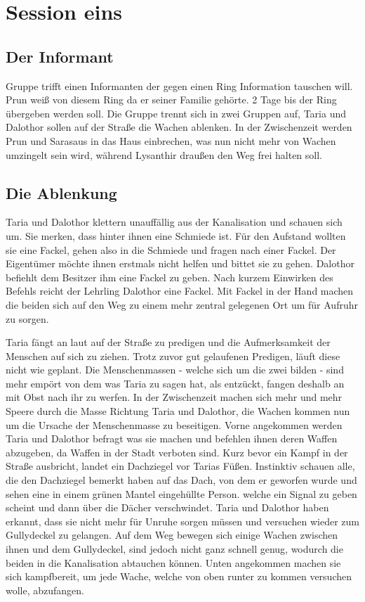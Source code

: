 \documentclass[10pt,twoside,twocolumn,openany]{book}
\begin{document}
	\chapter{Session eins}
	
	\section{Der Informant}
	
	Gruppe trifft einen Informanten der gegen einen Ring Information tauschen will.
	Prun weiß von diesem Ring da er seiner Familie gehörte.
	2 Tage bis der Ring übergeben werden soll.
	Die Gruppe trennt sich in zwei Gruppen auf, Taria und Dalothor sollen auf der Straße die Wachen ablenken. In der Zwischenzeit werden Prun und Sarasaus in das Haus einbrechen, was nun nicht mehr von Wachen umzingelt sein wird, während Lysanthir draußen den Weg frei halten soll.
	
	\section{Die Ablenkung}
	
	Taria und Dalothor klettern unauffällig aus der Kanalisation und schauen sich um. Sie merken, dass hinter ihnen eine Schmiede ist. Für den Aufstand wollten sie eine Fackel, gehen also in die Schmiede und fragen nach einer Fackel. Der Eigentümer möchte ihnen erstmals nicht helfen und bittet sie zu gehen. Dalothor befiehlt dem Besitzer ihm eine Fackel zu geben. Nach kurzem Einwirken des Befehls reicht der Lehrling Dalothor eine Fackel. Mit Fackel in der Hand machen die beiden sich auf den Weg zu einem mehr zentral gelegenen Ort um für Aufruhr zu sorgen. 

	Taria fängt an laut auf der Straße zu predigen und die Aufmerksamkeit der Menschen auf sich zu ziehen. Trotz zuvor gut gelaufenen Predigen, läuft diese nicht wie geplant. Die Menschenmassen - welche sich um die zwei bilden - sind mehr empört von dem was Taria zu sagen hat, als entzückt, fangen deshalb an mit Obst nach ihr zu werfen. In der Zwischenzeit machen sich mehr und mehr Speere durch die Masse Richtung Taria und Dalothor, die Wachen kommen nun um die Ursache der Menschenmasse zu beseitigen. Vorne angekommen werden Taria und Dalothor befragt was sie machen und befehlen ihnen deren Waffen abzugeben, da Waffen in der Stadt verboten sind. Kurz bevor ein Kampf in der Straße ausbricht, landet ein Dachziegel vor Tarias Füßen. Instinktiv schauen alle, die den Dachziegel bemerkt haben auf das Dach, von dem er geworfen wurde und sehen eine in einem grünen Mantel eingehüllte Person. welche ein Signal zu geben scheint und dann über die Dächer verschwindet. Taria und Dalothor haben erkannt, dass sie nicht mehr für Unruhe sorgen müssen und versuchen wieder zum Gullydeckel zu gelangen. Auf dem Weg bewegen sich einige Wachen zwischen ihnen und dem Gullydeckel, sind jedoch nicht ganz schnell genug, wodurch die beiden in die Kanalisation abtauchen können. Unten angekommen machen sie sich kampfbereit, um jede Wache, welche von oben runter zu kommen versuchen wolle, abzufangen. 
\end{document}
